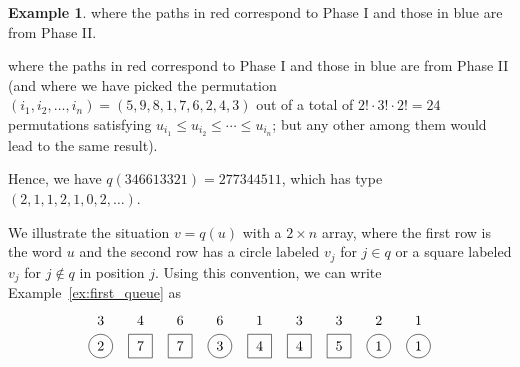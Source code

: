 \documentclass[reqno]{amsart}%
\newcommand{\0}{\phantom{c}}
\DeclareMathOperator{\inter}{int}
\newenvironment{verlong}{}{}
\newenvironment{vershort}{}{}
\newcommand{\defn}[1]{{\color{darkred}\emph{#1}}}
\theoremstyle{plain}
\theoremstyle{definition}
\newtheorem{example}[thm]{Example}
\numberwithin{equation}{section}
\begin{document}
\begin{example}
\begin{vershort}
where the paths in red correspond to Phase I and those in blue are from Phase II.
\end{vershort}

\begin{verlong}
where the paths in red correspond to Phase I and those in blue are from Phase
II (and where we have picked the permutation $\left(  i_{1}, i_{2}, \ldots,
i_{n} \right)  = \left(  5, 9, 8, 1, 7, 6, 2, 4, 3 \right)  $ out of a total
of $2! \cdot3! \cdot2! = 24$ permutations satisfying $u_{i_{1}} \leq u_{i_{2}}
\leq\cdots\leq u_{i_{n}}$; but any other among them would lead to the same result).
\end{verlong}

Hence, we have $q(346613321) = 277344511$, which has type
$(2,1,1,2,1,0,2,\ldots)$.
\end{example}

We illustrate the situation $v = q(u)$ with a $2 \times n$ array, where the
first row is the word $u$ and the second row has a circle labeled $v_{j}$ for
$j \in q$ or a square labeled $v_{j}$ for $j \notin q$ in position $j$. Using
this convention, we can write Example~\ref{ex:first_queue} as
\[
\begin{tikzpicture}[baseline=10]
\def\ll{0.65}   %
\foreach \i in {5,9} { \node at (\i,\ll) {$1$}; }
\foreach \i in {8} { \node at (\i,\ll) {$2$}; }
\foreach \i in {1,6,7} { \node at (\i,\ll) {$3$}; }
\foreach \i in {2} { \node at (\i,\ll) {$4$}; }
\foreach \i in {3,4} { \node at (\i,\ll) {$6$}; }
\foreach \i in {1,4,8,9} { \draw (\i,0) circle (0.3); }
\foreach \i in {2,3,5,6,7} { \draw (\i-.3,0-.3) rectangle +(0.6,+0.6); }
\foreach \i in {8,9} { \node at (\i,0) {$1$}; }
\foreach \i in {1} { \node at (\i,0) {$2$}; }
\foreach \i in {4} { \node at (\i,0) {$3$}; }
\foreach \i in {5,6} { \node at (\i,0) {$4$}; }
\foreach \i in {7} { \node at (\i,0) {$5$}; }
\foreach \i in {2,3} { \node at (\i,0) {$7$}; }
\end{tikzpicture}
\]


\begin{comment}  %
Consider a pair $k, k+1 \pmod{n}$ of consecutive columns.
For $s > t$ the \defn{$s$-flow} from $k+1$ to $k$ is the number of $i$ such that $u_i=s$, and whose queueing interval $\inter[j,i]$ contains both $k$ and $k+1$.
Similarly, for $s < t$, the \defn{$s$-flow} from $k$ to $k+1$ is the number of $i$ such that $u_i = s$, and whose queueing interval $\inter[i,j]$ contains both $k$ and $k+1$.
\end{comment}
\end{document}
